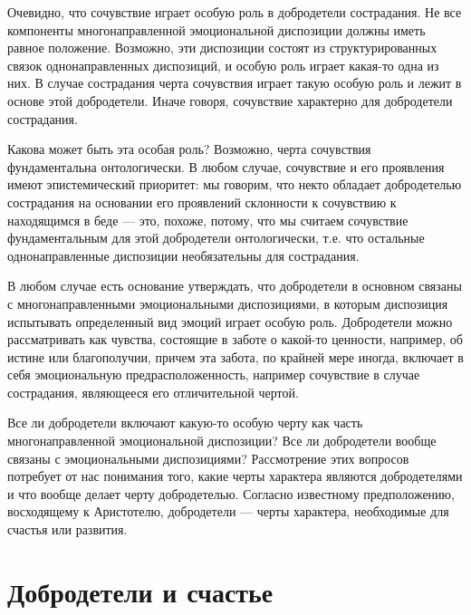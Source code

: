 \documentclass[11pt]{book}
\begin{document}
Очевидно, что сочувствие играет особую роль в добродетели сострадания. Не все компоненты многонаправленной эмоциональной диспозиции должны иметь равное положение. Возможно, эти диспозиции состоят из структурированных связок однонаправленных диспозиций, и особую роль играет какая-то одна из них. В случае сострадания черта сочувствия играет такую особую роль и лежит в основе этой добродетели. Иначе говоря, сочувствие характерно для добродетели сострадания.

Какова может быть эта особая роль? Возможно, черта сочувствия фундаментальна онтологически. В любом случае, сочувствие и его проявления имеют эпистемический приоритет: мы говорим, что некто обладает добродетелью сострадания на основании его проявлений склонности к сочувствию к находящимся в беде --- это, похоже, потому, что мы считаем сочувствие фундаментальным для этой добродетели онтологически, т.е. что остальные однонаправленные диспозиции необязательны для сострадания.

В любом случае есть основание утверждать, что добродетели в основном связаны с многонаправленными эмоциональными диспозициями, в которым диспозиция испытывать определенный вид эмоций играет особую роль. Добродетели можно рассматривать как чувства, состоящие в заботе о какой-то ценности, например, об истине или благополучии, причем эта забота, по крайней мере иногда, включает в себя эмоциональную предрасположенность, например сочувствие в случае сострадания, являющееся его отличительной чертой.

Все ли добродетели включают какую-то особую черту как часть многонаправленной эмоциональной диспозиции? Все ли добродетели вообще связаны с эмоциональными диспозициями? Рассмотрение этих вопросов потребует от нас понимания того, какие черты характера являются добродетелями и что вообще делает черту добродетелью. Согласно известному предположению, восходящему к Аристотелю, добродетели --- черты характера, необходимые для счастья или развития.

\section{Добродетели и счастье}
\end{document}
